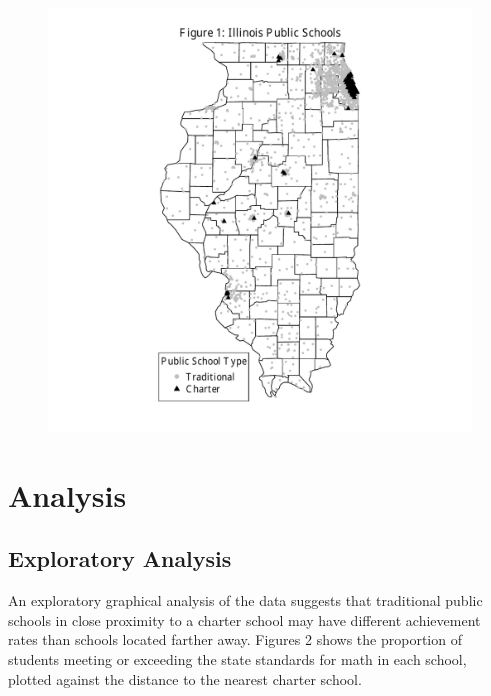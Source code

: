\documentclass[11pt]{article}
\begin{document}
\begin{figure}[H]
\centering
    \includegraphics[trim=0 0.25in 0 0.25in, clip,scale=0.8]{ilmap}
\end{figure}

\section{Analysis}

\subsection{Exploratory Analysis}
An exploratory graphical analysis of the data suggests that traditional public schools in close proximity to a charter school may have different achievement rates than schools located farther away.  Figures 2 shows the proportion of students meeting or exceeding the state standards for math in each school, plotted against the distance to the nearest charter school.  
\end{document}
